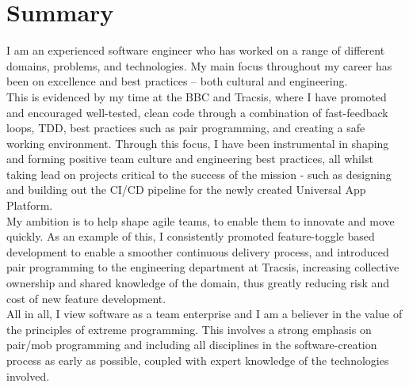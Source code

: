 \section{Summary}

I am an experienced software engineer who has worked on a range of different domains, problems, and technologies. My main focus throughout my career has been on excellence and best practices – both cultural and engineering.\\

This is evidenced by my time at the BBC and Tracsis, where I have promoted and encouraged well-tested, clean code through a combination of fast-feedback loops, TDD, best practices such as pair programming, and creating a safe working environment. Through this focus, I have been instrumental in shaping and forming positive team culture and engineering best practices, all whilst taking lead on projects critical to the success of the mission - such as designing and building out the CI/CD pipeline for the newly created Universal App Platform.\\

My ambition is to help shape agile teams, to enable them to innovate and move quickly. As an example of this, I consistently promoted feature-toggle based development to enable a smoother continuous delivery process, and introduced pair programming to the engineering department at Tracsis, increasing collective ownership and shared knowledge of the domain, thus greatly reducing risk and cost of new feature development.\\

All in all, I view software as a team enterprise and I am a believer in the value of the principles of extreme programming. This involves a strong emphasis on pair/mob programming and including all disciplines in the software-creation process as early as possible, coupled with expert knowledge of the technologies involved.\\
